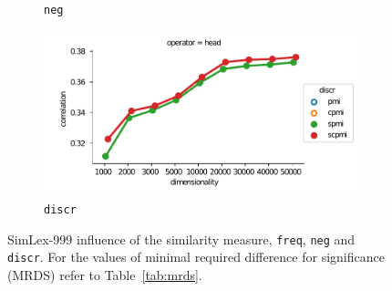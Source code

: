 \begin{figure}
\begin{subfigure}[t]{0.49\textwidth}
  \caption{\texttt{neg}}
  \label{fig:SimLex999-neg}
  \end{subfigure}
  \begin{subfigure}[t]{0.49\textwidth}
  \includegraphics[width=\textwidth]{supplement/figures/SimLex999-interaction-discr}

  \caption{\texttt{discr}}
  \label{fig:SimLex999-discr}
  \end{subfigure}
  
  \caption[SimLex-999 influence of the similarity measure, \texttt{freq}, \texttt{neg} and \texttt{discr}]{SimLex-999 influence of the similarity measure, \texttt{freq}, \texttt{neg} and \texttt{discr}. For the values of minimal required difference for significance (MRDS) refer to Table~\ref{tab:mrds}.}
\end{figure}
